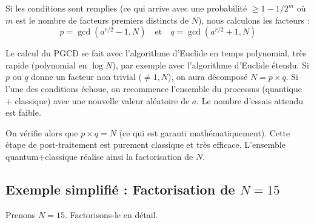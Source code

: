 \documentclass[11pt,a4paper]{article}
\begin{document}
Si les conditions sont remplies (ce qui arrive avec une probabilité $\geq 1-1/2^m$ où $m$ est le nombre de facteurs premiers distincts de $N$), nous calculons les facteurs :
\[p = \gcd(a^{r/2} - 1, N) \quad \text{et} \quad q = \gcd(a^{r/2} + 1, N)\]

Le calcul du PGCD se fait avec l'algorithme d'Euclide en temps polynomial, très rapide (polynomial en $\log N$), par exemple avec l'algorithme d'Euclide étendu. Si $p$ ou $q$ donne un facteur non trivial ($\neq 1, N$), on aura décomposé $N = p \times q$. Si l'une des conditions échoue, on recommence l'ensemble du processus (quantique + classique) avec une nouvelle valeur aléatoire de $a$. Le nombre d'essais attendu est faible.

On vérifie alors que $p \times q = N$ (ce qui est garanti mathématiquement). Cette étape de post-traitement est purement classique et très efficace. L'ensemble quantum+classique réalise ainsi la factorisation de $N$.

\subsection{Exemple simplifié : Factorisation de $N = 15$}

Prenons $N = 15$. Factorisons-le en détail.
\end{document}
